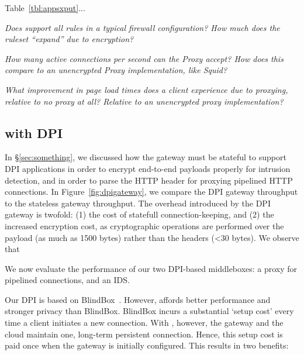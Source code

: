 Table~\ref{tbl:appsxput}...



{\it Does \sys support all rules in a typical firewall configuration? How much does the ruleset ``expand'' due to encryption?}



{\it How many active connections per second can the Proxy accept? How does this compare to an unencrypted Proxy implementation, like Squid?}

{\it What improvement in page load times does a client experience due to proxying, relative to no proxy at all? Relative to an unencrypted proxy implementation?}



\subsection{\sys with DPI}
In \S\ref{sec:something}, we discussed how the \sys gateway must be stateful to support DPI applications in order to encrypt end-to-end payloads properly for intrusion detection, and in order to parse the HTTP header for proxying pipelined HTTP connections. 
In Figure~\ref{fig:dpigateway}, we compare the DPI gateway throughput to the stateless gateway throughput. 
The overhead introduced by the DPI gateway is twofold: (1) the cost of statefull connection-keeping, and (2) the increased encryption cost, as cryptographic operations are performed over the payload (as much as 1500 bytes) rather than the headers (<30 bytes).
We observe that~

We now evaluate the performance of our two DPI-based middleboxes: a proxy for pipelined connections, and an IDS.

Our DPI is based on BlindBox~\cite{blindbox}. However, \sys affords better performance and stronger privacy than BlindBox. BlindBox incurs a substantial `setup cost' every time a client initiates a new connection. With \sys, however, the gateway and the cloud maintain one, long-term persistent connection. 
Hence, this setup cost is paid once when the gateway is initially configured. This results in two benefits:

